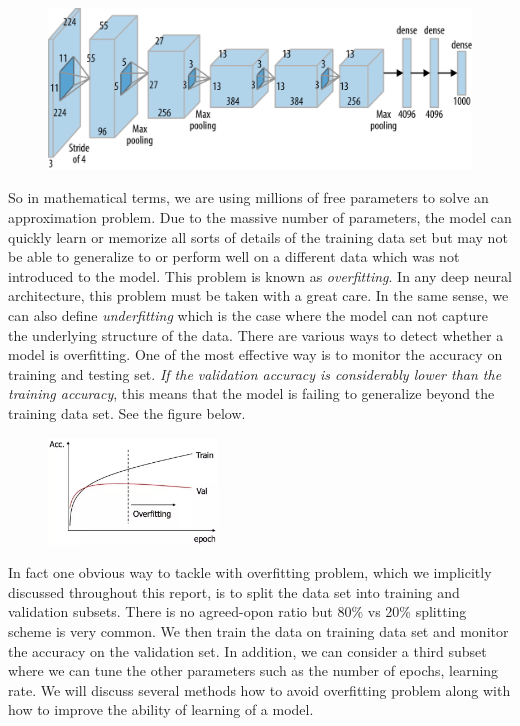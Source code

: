 \documentclass[12pt]{article}
\begin{document}
\begin{figure}[H]
 \label{fig:alex}
  \centering
  \includegraphics[width=1.1\textwidth]{alex.png}
\end{figure}
So in mathematical terms, we are using millions of free parameters to solve an approximation problem. Due to the massive number of parameters, the model can quickly learn or memorize all sorts of details of the training data set but may not be able to generalize to or perform well on a different data which was not introduced to the model. This problem is known as \textit{overfitting}. In any deep neural architecture, this problem must be taken with a great care. In the same sense, we can also define \textit{underfitting} which is the case where the model can not capture the underlying structure of the data. There are various ways to detect whether a model is overfitting. One of the most effective way is to monitor the accuracy on training and testing set. \textit{If the validation accuracy is considerably lower than the training accuracy}, this means that the model is failing to generalize beyond the training data set. See the figure below.

\begin{figure}[H]
 \label{fig:overfit}
  \centering
  \includegraphics[width=0.4\textwidth]{overfit.png}
\end{figure}

In fact one obvious way to tackle with overfitting problem, which we implicitly discussed throughout this report, is to split the data set into training and validation subsets. There is no agreed-opon ratio but 80\% vs 20\% splitting scheme is very common. We then train the data on training data set and monitor the accuracy on the validation set. In addition, we can consider a third subset where we can tune the other parameters such as the number of epochs, learning rate. We will discuss several methods how to avoid overfitting problem along with how to improve the ability of learning of a model.
\end{document}
